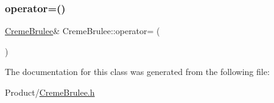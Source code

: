 \subsubsection{\texorpdfstring{operator=()}{operator=()}}
{\footnotesize\ttfamily \mbox{\hyperlink{classCremeBrulee}{Creme\+Brulee}}\& Creme\+Brulee\+::operator= (\begin{DoxyParamCaption}\item[{const \mbox{\hyperlink{classCremeBrulee}{Creme\+Brulee}} \&}]{ }\end{DoxyParamCaption})}



The documentation for this class was generated from the following file\+:\begin{DoxyCompactItemize}
\item 
Product/\mbox{\hyperlink{CremeBrulee_8h}{Creme\+Brulee.\+h}}\end{DoxyCompactItemize}
